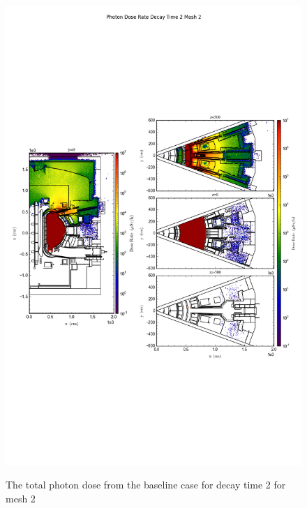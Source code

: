 \begin{figure}[ht!]
\centering
\includegraphics[trim={0cm 9cm 0cm 10cm},clip,scale=0.75]{../plots/final_model/Photon_Dose_Rate_Decay_Time_2_Mesh_2.png}
\label{fig:photons_dc2_no4bc_m2_flux}
\caption{The total photon dose from the baseline case for decay time 2 for mesh 2}
\end{figure}
